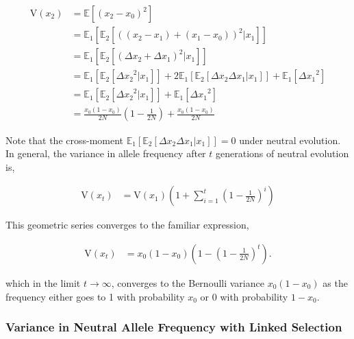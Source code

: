 \documentclass[11pt]{article}
\newcommand{\E}{\mathbb{E}}
\newcommand{\V}{\text{V}}
\begin{document}
\begin{align}
  \V(x_2) &= \E\left[(x_2 - x_0)^2\right] \\
          &= \E_1\left[\E_2\left[((x_2-x_1) + (x_1 - x_0))^2 | x_1\right]\right] \\
          &= \E_1\left[\E_2\left[(\Delta x_2 + \Delta x_1)^2 | x_1\right]\right] \\
          &= \E_1\left[\E_2\left[{\Delta x_2}^2|x_1\right]\right] + 2\E_1\left[\E_2[\Delta x_2 \Delta x_1 | x_1]\right] + \E_1\left[ {\Delta x_1}^2\right] \\
          &= \E_1\left[\E_2\left[{\Delta x_2}^2|x_1\right]\right] + \E_1\left[ {\Delta x_1}^2\right] \\
          &= \frac{x_0(1-x_0)}{2N}\left(1 - \frac{1}{2N}\right) + \frac{x_0(1-x_0)}{2N}
\end{align}

Note that the cross-moment $\E_1\left[\E_2[\Delta x_2 \Delta x_1 | x_1]\right]
= 0$ under neutral evolution. In general, the variance in allele frequency
after $t$ generations of neutral evolution is,

\begin{align}
  \label{eq:var_freq}
  \V(x_t) &= \V(x_1) \left(1 + \sum_{i=1}^t \left(1 - \frac{1}{2N}\right)^{i} \right)
\end{align}

This geometric series converges to the familiar expression,

\begin{align}
  \V(x_t) &= x_0(1-x_0)\left(1 - \left(1 - \frac{1}{2N}\right)^t \right).
\end{align}

which in the limit $t \to \infty$, converges to the Bernoulli variance
$x_0(1-x_0)$ as the frequency either goes to 1 with probability $x_0$ or 0 with
probability $1-x_0$.




\subsubsection*{Variance in Neutral Allele Frequency with Linked Selection}
\end{document}
